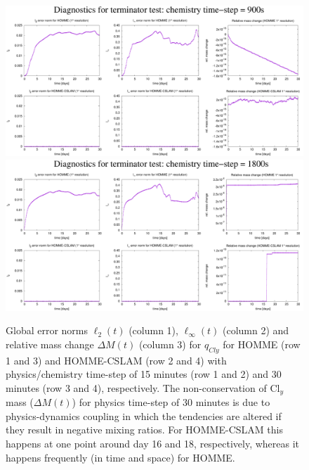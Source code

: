 \documentclass[times,doublespace]{fldauth}
\begin{document}
\begin{figure}[tb]
\center\includegraphics[width=\linewidth]{terminator_diags-t_phys900.pdf}
\center\includegraphics[width=\linewidth]{terminator_diags-t_phys1800.pdf}
  \caption{Global error norms $\ell_2(t)$ (column 1), $\ell_\infty(t)$ (column 2) and relative mass change $\Delta M(t)$ (column 3) for $q_{Cly}$ for HOMME  (row 1 and 3) and HOMME-CSLAM  (row 2 and 4) with physics/chemistry time-step of 15 minutes (row 1 and 2) and 30 minutes (row 3 and 4), respectively. The non-conservation of Cl$_y$ mass ($\Delta M(t)$) for physics time-step of 30 minutes is due to physics-dynamics coupling in which the tendencies are altered if they result in negative mixing ratios. For HOMME-CSLAM this happens at one point around day 16 and 18, respectively, whereas it happens frequently (in time and space) for HOMME.}\label{fig:terminator-diags}
\end{figure} 



%
\end{document}
